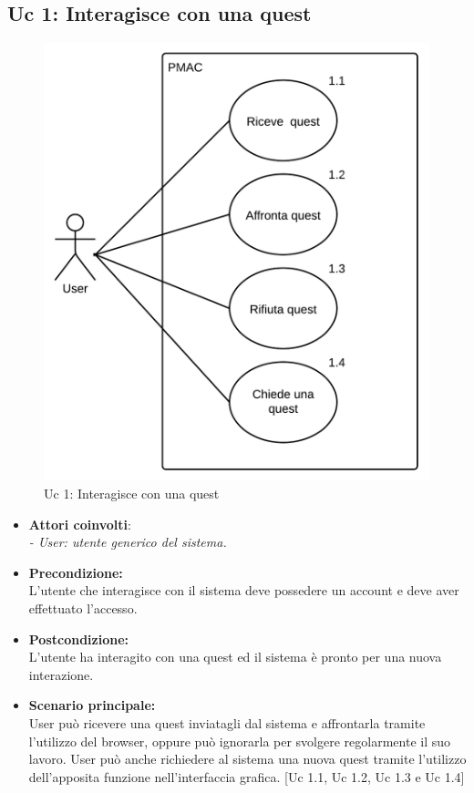 \documentclass[10pt,a4paper]{article}
\begin{document}
\subsection{Uc 1: Interagisce con una quest}
\begin{figure}[ht]
\centering
\caption{Uc 1: Interagisce con una quest}
\includegraphics[scale=0.8]{UseCase/Uc1} %
\end{figure}

\begin{itemize}
\item \textbf{Attori coinvolti}:\\
\emph{- User: utente generico del sistema.}

\item \textbf{Precondizione:}\\
L'utente che interagisce con il sistema deve possedere un account e deve aver effettuato l'accesso.

\item \textbf{Postcondizione:}\\
L'utente ha interagito con una quest ed il sistema è pronto per una nuova interazione.

\item \textbf{Scenario principale:}\\
User può ricevere una quest inviatagli dal sistema e affrontarla tramite l'utilizzo del browser, oppure può ignorarla per svolgere regolarmente il suo lavoro. User può anche richiedere al sistema una nuova quest tramite l'utilizzo dell'apposita funzione nell'interfaccia grafica. [Uc 1.1, Uc 1.2, Uc 1.3 e Uc 1.4]
\end{itemize}
\newpage
\end{document}
